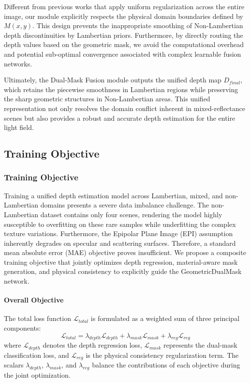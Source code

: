 \documentclass[lettersize,journal]{IEEEtran}
\begin{document}
Different from previous works that apply uniform regularization across the entire image, our module explicitly respects the physical domain boundaries defined by $M(x,y)$. This design prevents the inappropriate smoothing of Non-Lambertian depth discontinuities by Lambertian priors. Furthermore, by directly routing the depth values based on the geometric mask, we avoid the computational overhead and potential sub-optimal convergence associated with complex learnable fusion networks. 

Ultimately, the Dual-Mask Fusion module outputs the unified depth map $D_{final}$, which retains the piecewise smoothness in Lambertian regions while preserving the sharp geometric structures in Non-Lambertian areas. This unified representation not only resolves the domain conflict inherent in mixed-reflectance scenes but also provides a robust and accurate depth estimation for the entire light field.

\subsection{Training Objective}

\subsubsection{Training Objective}

Training a unified depth estimation model across Lambertian, mixed, and non-Lambertian domains presents a severe data imbalance challenge. The non-Lambertian dataset contains only four scenes, rendering the model highly susceptible to overfitting on these rare samples while underfitting the complex texture variations. Furthermore, the Epipolar Plane Image (EPI) assumption inherently degrades on specular and scattering surfaces. Therefore, a standard mean absolute error (MAE) objective proves insufficient. We propose a composite training objective that jointly optimizes depth regression, material-aware mask generation, and physical consistency to explicitly guide the GeometricDualMask network.

\paragraph{Overall Objective}
The total loss function $\mathcal{L}_{total}$ is formulated as a weighted sum of three principal components:
\begin{equation} \label{eq:ch3_17}
\mathcal{L}_{total} = \lambda_{depth} \mathcal{L}_{depth} + \lambda_{mask} \mathcal{L}_{mask} + \lambda_{reg} \mathcal{L}_{reg}
\end{equation}
where $\mathcal{L}_{depth}$ denotes the depth regression loss, $\mathcal{L}_{mask}$ represents the dual-mask classification loss, and $\mathcal{L}_{reg}$ is the physical consistency regularization term. The scalars $\lambda_{depth}$, $\lambda_{mask}$, and $\lambda_{reg}$ balance the contributions of each objective during the joint optimization.
\end{document}
